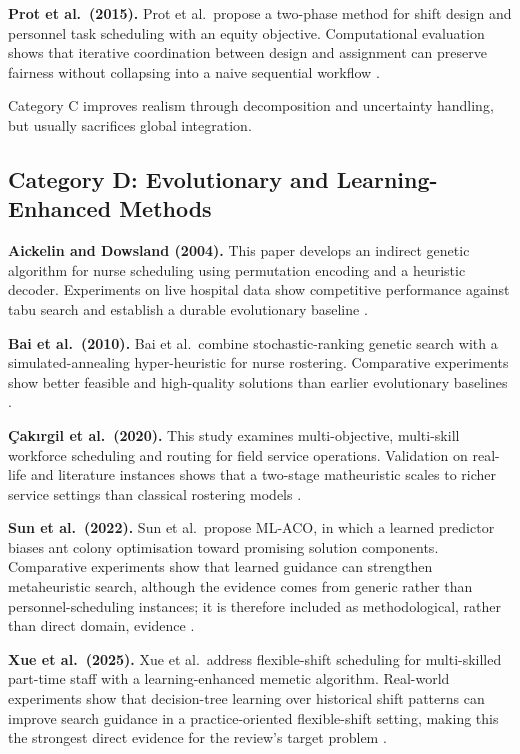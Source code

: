 \documentclass[12pt]{article}
\begin{document}
\textbf{Prot et al.\ (2015).} Prot et al.\ propose a two-phase method for shift design and personnel task scheduling with an equity objective. Computational evaluation shows that iterative coordination between design and assignment can preserve fairness without collapsing into a naive sequential workflow \cite{prot2015}.

Category C improves realism through decomposition and uncertainty handling, but usually sacrifices global integration.

\subsection{Category D: Evolutionary and Learning-Enhanced Methods}

\textbf{Aickelin and Dowsland (2004).} This paper develops an indirect genetic algorithm for nurse scheduling using permutation encoding and a heuristic decoder. Experiments on live hospital data show competitive performance against tabu search and establish a durable evolutionary baseline \cite{aickelin2004}.

\textbf{Bai et al.\ (2010).} Bai et al.\ combine stochastic-ranking genetic search with a simulated-annealing hyper-heuristic for nurse rostering. Comparative experiments show better feasible and high-quality solutions than earlier evolutionary baselines \cite{bai2010}.

\textbf{\c{C}ak{\i}rgil et al.\ (2020).} This study examines multi-objective, multi-skill workforce scheduling and routing for field service operations. Validation on real-life and literature instances shows that a two-stage matheuristic scales to richer service settings than classical rostering models \cite{cakirgil2020}.

\textbf{Sun et al.\ (2022).} Sun et al.\ propose ML-ACO, in which a learned predictor biases ant colony optimisation toward promising solution components. Comparative experiments show that learned guidance can strengthen metaheuristic search, although the evidence comes from generic rather than personnel-scheduling instances; it is therefore included as methodological, rather than direct domain, evidence \cite{sun2022}.

\textbf{Xue et al.\ (2025).} Xue et al.\ address flexible-shift scheduling for multi-skilled part-time staff with a learning-enhanced memetic algorithm. Real-world experiments show that decision-tree learning over historical shift patterns can improve search guidance in a practice-oriented flexible-shift setting, making this the strongest direct evidence for the review's target problem \cite{xue2025}.
\end{document}
